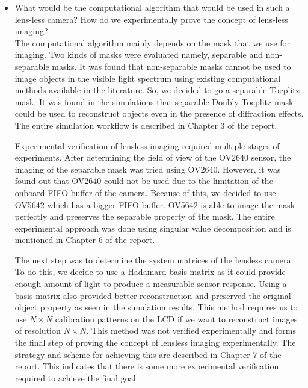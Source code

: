 \begin{itemize}
\item What would be the computational algorithm that would be used in such a lens-less camera? How do we experimentally prove the concept of lens-less imaging?\\
The computational algorithm mainly depends on the mask that we use for imaging. Two kinds of masks were evaluated namely, separable and non-separable masks. It was found that non-separable masks cannot be used to image objects in the visible light spectrum using existing computational methods available in the literature. So, we decided to go a separable Toeplitz mask. It was found in the simulations that separable Doubly-Toeplitz mask could be used to reconstruct objects even in the presence of diffraction effects. The entire simulation workflow is described in Chapter 3 of the report.

Experimental verification of lensless imaging required multiple stages of experiments. After determining the field of view of the OV2640 sensor, the imaging of the separable mask was tried using OV2640. However, it was found out that OV2640 could not be used due to the limitation of the onboard FIFO buffer of the camera. Because of this, we decided to use OV5642 which has a bigger FIFO buffer. OV5642 is able to image the mask perfectly and preserves the separable property of the mask. The entire experimental approach was done using singular value decomposition and is mentioned in Chapter 6 of the report.  

The next step was to determine the system matrices of the lensless camera. To do this, we decide to use a Hadamard basis matrix as it could provide enough amount of light to produce a measurable sensor response. Using a basis matrix also provided better reconstruction and preserved the original object property as seen in the simulation results. This method requires us to use $N \times N$ calibration patterns on the LCD if we want to reconstruct images of resolution $N \times N$. This method was not verified experimentally and forms the final step of proving the concept of lensless imaging experimentally. The strategy and scheme for achieving this are described in Chapter 7 of the report. This indicates that there is some more experimental verification required to achieve the final goal.

\end{itemize}

